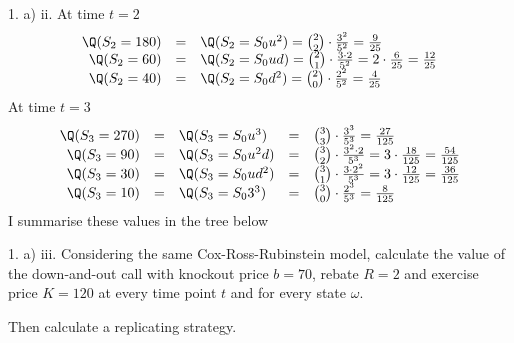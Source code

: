 \documentclass[11pt,a4paper]{article}
\begin{document}
\begin{answer}{1. a) ii.}
  At time $t=2$
  \[\begin{array}{rcl}
    \Q(S_2=180)&=&\Q(S_2=S_0u^2)
    ={2\choose2}\cdot\frac{3^2}{5^2}
    =\frac9{25}\\
    \Q(S_2=60)&=&\Q(S_2=S_0ud)
    ={2\choose1}\cdot\frac{3\cdot2}{5^2}
    =2\cdot\frac6{25}=\frac{12}{25}\\
    \Q(S_2=40)&=&\Q(S_2=S_0d^2)
    ={2\choose0}\cdot\frac{2^2}{5^2}
    =\frac4{25}
  \end{array}\]
  At time $t=3$
  \[\begin{array}{rclcl}
    \Q(S_3=270)&=&\Q(S_3=S_0u^3)
    &=&{3\choose3}\cdot\frac{3^3}{5^3}
    =\frac{27}{125}\\
    \Q(S_3=90)&=&\Q(S_3=S_0u^2d)
    &=&{3\choose2}\cdot\frac{3^2\cdot2}{5^3}
    =3\cdot\frac{18}{125}=\frac{54}{125}\\
    \Q(S_3=30)&=&\Q(S_3=S_0ud^2)
    &=&{3\choose1}\cdot\frac{3\cdot2^2}{5^3}
    =3\cdot\frac{12}{125}
    =\frac{36}{125}\\
    \Q(S_3=10)&=&\Q(S_3=S_03^3)
    &=&{3\choose0}\cdot\frac{2^3}{5^3}
    =\frac{8}{125}\\
  \end{array}\]
  I summarise these values in the tree below
  \begin{center}
  \end{center}
\end{answer}

\begin{question}{1. a) iii.}
  Considering the same Cox-Ross-Rubinstein model, calculate the value of the down-and-out call with knockout price $b=70$, rebate $R=2$ and exercise price $K=120$ at every time point $t$ and for every state $\omega$.
  \par Then calculate a replicating strategy.
\end{question}
\end{document}
